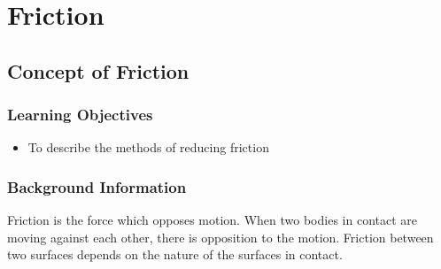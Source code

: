 \section{Friction}




\subsection{Concept of Friction}

\subsubsection*{Learning Objectives}
\begin{itemize}
\item{To describe the methods of reducing friction} 
\end{itemize}

\subsubsection*{Background Information}
Friction is the force which opposes motion.  When two bodies in contact are moving against each other, there is opposition to the motion.  Friction between two surfaces depends on the nature of the surfaces in contact.

